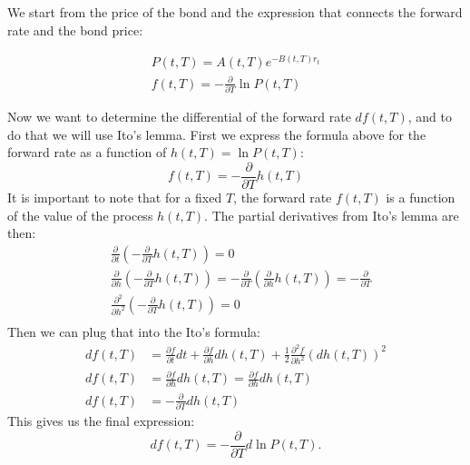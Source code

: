 \documentclass[titlepage, 12pt]{article}
\begin{document}
	We start from the price of the bond and the expression that connects the forward rate and the bond price:
	
	\begin{equation}
		\begin{split}
			P(t,T) = A(t,T)e^{-B(t,T)r_t} \\
			f(t,T) = -\frac{\partial}{\partial T}\ln P(t,T)
		\end{split}
	\end{equation}
	
	Now we want to determine the differential of the forward rate $df(t,T)$, and to do that we will use Ito's lemma. First we express the formula above for the forward rate as a function of $h(t,T) = \ln P(t,T)$:
	\begin{equation}
		f(t,T) = -\frac{\partial}{\partial T}h(t,T)
	\end{equation}
	It is important to note that for a fixed $T$, the forward rate $f(t,T)$ is a function of the value of the process $h(t,T)$. The partial derivatives from Ito's lemma are then:
	\begin{equation}
		\begin{split}
			&\frac{\partial }{\partial t}\left(-\frac{\partial}{\partial T}h(t,T)\right)	= 0 \\
			&\frac{\partial }{\partial h}\left(-\frac{\partial}{\partial T}h(t,T)\right)	=  -\frac{\partial }{\partial T}\left(\frac{\partial}{\partial h}h(t,T)\right) =  -\frac{\partial }{\partial T}\\
			&\frac{\partial^2 }{\partial h^2}\left(-\frac{\partial}{\partial T}h(t,T)\right)	=  0\\
		\end{split}
	\end{equation}
	Then we can plug that into the Ito's formula:
	\begin{equation}
		\begin{split}
			df(t,T) &= \frac{\partial f}{\partial t}dt + \frac{\partial f}{\partial h}dh(t,T) + \frac{1}{2}\frac{\partial^2 f}{\partial h^2}(dh(t,T))^2 \\
			df(t,T) &= \frac{\partial f}{\partial h}dh(t,T) = \frac{\partial f}{\partial h}dh(t,T) \\
			df(t,T) &= -\frac{\partial }{\partial T} dh(t,T)
		\end{split}
	\end{equation}
	This gives us the final expression:
	\begin{equation}
		df(t,T) = -\frac{\partial}{\partial T}d\ln P(t,T).
	\end{equation}
\end{document}
